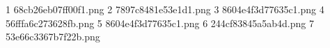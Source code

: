 1 68cb26eb07ff00f1.png
2 7897c8481e53e1d1.png
3 8604e4f3d77635c1.png
4 56fffa6c273628fb.png
5 8604e4f3d77635c1.png
6 244cf83845a5ab4d.png
7 53e66c3367b7f22b.png
